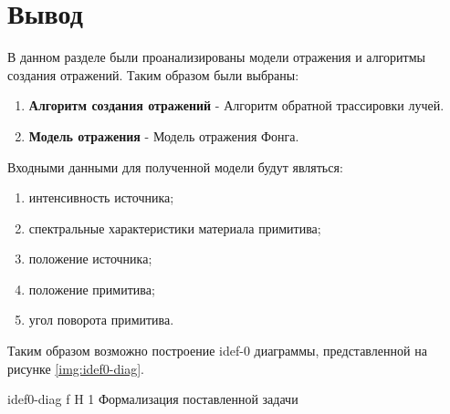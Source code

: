 \section*{Вывод}
В данном разделе были проанализированы модели отражения и алгоритмы создания отражений.
Таким образом были выбраны:
\begin{enumerate}
	\item \textbf{Алгоритм создания отражений} - Алгоритм обратной трассировки лучей.
	\item \textbf{Модель отражения} - Модель отражения Фонга.
\end{enumerate}


Входными данными для полученной модели будут являться:
\begin{enumerate}
	\item интенсивность источника;
	\item спектральные характеристики материала примитива;
	\item положение источника;
	\item положение примитива;
	\item угол поворота примитива.
\end{enumerate}

Таким образом возможно построение idef-0 диаграммы, представленной на рисунке \ref{img:idef0-diag}.

{idef0-diag} %
{f} %
{H} %
{1\textwidth} %
{Формализация поставленной задачи} %

